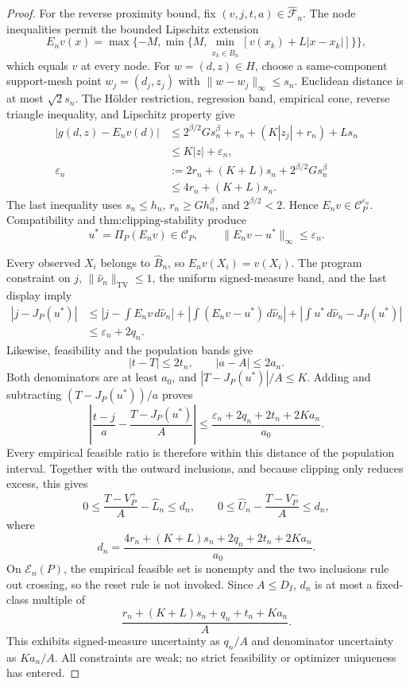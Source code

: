 \documentclass{article}
\begin{document}
\begin{proof}
For the reverse proximity bound, fix \((v,j,t,a)\in\widehat{\mathscr F}_n\).  The node inequalities permit the bounded Lipschitz extension
\[
 E_nv(x)=\max\{-M,\min\{M,\min_{x_k\in\widehat B_n}[v(x_k)+L|x-x_k|]\}\},
\]
which equals \(v\) at every node.  For \(w=(d,z)\in H\), choose a same-component support-mesh point \(w_j=(d_j,z_j)\) with \(\|w-w_j\|_\infty\leq s_n\).  Euclidean distance is at most \(\sqrt2s_n\).  The H\"older restriction, regression band, empirical cone, reverse triangle inequality, and Lipschitz property give
\[
 \begin{aligned}
 |g(d,z)-E_nv(d)|
 &\leq2^{\beta/2}Gs_n^\beta+r_n+(K|z_j|+r_n)+Ls_n\\
 &\leq K|z|+\varepsilon_n,\\
 \varepsilon_n&:=2r_n+(K+L)s_n+2^{\beta/2}Gs_n^\beta\\
 &\leq4r_n+(K+L)s_n.
 \end{aligned}
\]
The last inequality uses \(s_n\leq h_n\), \(r_n\geq Gh_n^\beta\), and \(2^{\beta/2}<2\).  Hence \(E_nv\in\mathcal C_P^{\varepsilon_n}\).  Compatibility and \(\text{thm:clipping-stability}\) produce
\[
 u^*=\Pi_P(E_nv)\in\mathcal C_P,
 \qquad
 \|E_nv-u^*\|_\infty\leq\varepsilon_n.
\]

Every observed \(X_i\) belongs to \(\widehat B_n\), so \(E_nv(X_i)=v(X_i)\).  The program constraint on \(j\), \(\|\widehat\nu_n\|_{\mathrm{TV}}\leq1\), the uniform signed-measure band, and the last display imply
\[
 \begin{aligned}
 |j-J_P(u^*)|
 &\leq\left|j-\int E_nv\,d\widehat\nu_n\right|
 +\left|\int(E_nv-u^*)\,d\widehat\nu_n\right|
 +\left|\int u^*\,d\widehat\nu_n-J_P(u^*)\right|\\
 &\leq\varepsilon_n+2q_n.
 \end{aligned}
\]
Likewise, feasibility and the population bands give
\[
 |t-T|\leq2t_n,
 \qquad
 |a-A|\leq2a_n.
\]
Both denominators are at least \(a_0\), and \(|T-J_P(u^*)|/A\leq K\).  Adding and subtracting \((T-J_P(u^*))/a\) proves
\[
 \left|\frac{t-j}{a}-\frac{T-J_P(u^*)}{A}\right|
 \leq\frac{\varepsilon_n+2q_n+2t_n+2Ka_n}{a_0}.
\]
Every empirical feasible ratio is therefore within this distance of the population interval.  Together with the outward inclusions, and because clipping only reduces excess, this gives
\[
 0\leq\frac{T-V_P^+}{A}-\widehat L_n\leq d_n,
 \qquad
 0\leq\widehat U_n-\frac{T-V_P^-}{A}\leq d_n,
\]
where
\[
 d_n=\frac{4r_n+(K+L)s_n+2q_n+2t_n+2Ka_n}{a_0}.
\]
On \(\mathcal E_n(P)\), the empirical feasible set is nonempty and the two inclusions rule out crossing, so the reset rule is not invoked.  Since \(A\leq D_I\), \(d_n\) is at most a fixed-class multiple of
\[
 \frac{r_n+(K+L)s_n+q_n+t_n+Ka_n}{A}.
\]
This exhibits signed-measure uncertainty as \(q_n/A\) and denominator uncertainty as \(Ka_n/A\).  All constraints are weak; no strict feasibility or optimizer uniqueness has entered.


\end{proof}
\end{document}

